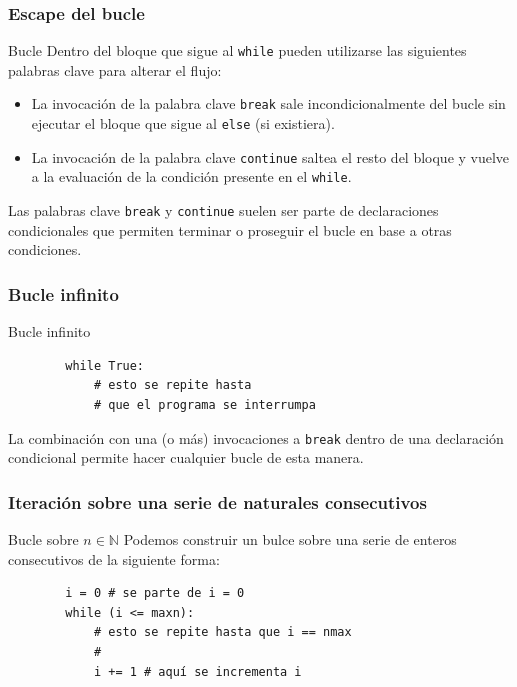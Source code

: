 \documentclass{beamer}
\begin{document}
\begin{frame}[fragile]
    \frametitle{Escape del bucle}
    \begin{block}{Bucle}
        Dentro del bloque que sigue al \texttt{while} pueden utilizarse las siguientes palabras clave para alterar el flujo:
        \begin{itemize}
            \item La invocación de la palabra clave \texttt{break} sale incondicionalmente del bucle sin ejecutar el bloque que sigue
            al \texttt{else} (si existiera).
            \item La invocación de la palabra clave \texttt{continue} saltea el resto del bloque y vuelve a la evaluación de la condición
            presente en el \texttt{while}.
        \end{itemize}
    \end{block}
    Las palabras clave \texttt{break} y \texttt{continue} suelen ser parte de declaraciones condicionales que 
    permiten terminar o proseguir el bucle en base a otras condiciones.
\end{frame}

\begin{frame}[fragile]
    \frametitle{Bucle infinito}
    \begin{block}{Bucle infinito}
    \begin{verbatim}
        while True:
            # esto se repite hasta
            # que el programa se interrumpa
    \end{verbatim}
    \end{block}
    La combinación con una (o más) invocaciones a \texttt{break} dentro de una declaración condicional permite
    hacer cualquier bucle de esta manera.
\end{frame}

\begin{frame}[fragile]
    \frametitle{Iteración sobre una serie de naturales consecutivos}
    \begin{block}{Bucle sobre $n\in\mathbb{N}$}
    Podemos construir un bulce sobre una serie de enteros consecutivos de la siguiente forma:
    \begin{verbatim}
        i = 0 # se parte de i = 0
        while (i <= maxn):
            # esto se repite hasta que i == nmax
            #
            i += 1 # aquí se incrementa i
    \end{verbatim}
    \end{block}
\end{frame}
\end{document}
